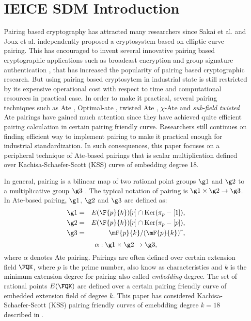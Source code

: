 \section{IEICE SDM Introduction}

Pairing based cryptography has attracted many researchers since Sakai et al. \cite{EPRINT:SakKas03} and Joux et al. \cite{JC:Joux04} independently proposed a cryptosystem based on elliptic curve pairing. This has encouraged to invent several innovative pairing based cryptographic applications such as broadcast encryption \cite{C:BonGenWat05} and group signature authentication \cite{C:BonBoySha04}, that has increased the popularity of pairing based cryptographic research.
But using pairing based cryptosytem in industrial state is still restricted by its expensive operational cost with respect to time and computational resources in practical case. 
In order to make it practical, several pairing techniques such as Ate \cite{DBLP:reference/crc/2005ehcc}, Optimal-ate \cite{DBLP:journals/tit/Vercauteren10}, twisted Ate \cite{EPRINT:MKHO07}, $\chi$-Ate \cite{PAIRING:NASKM08} and \textit{sub-field twisted} Ate \cite{PAIRING:DevScoDah07} pairings have gained much attention since they have achieved quite efficient pairing calculation in certain pairing friendly curve. 
Researchers still continues on finding efficient way to implement pairing to make it practical enough for industrial standardization. 
In such consequences, this paper focuses on a peripheral technique of Ate-based pairings  that is scalar multiplication defined over Kachisa-Schaefer-Scott (KSS) curve \cite{EPRINT:KacSchSco07} of embedding degree 18. 

In general, pairing is a bilinear map of two rational point groups $\g1$ and $\g2$ to a multiplicative group $\g3$ \cite{Silverman}.
The typical notation of pairing is $\g1 \times \g2 \rightarrow \g3$.
In  Ate-based pairing, $\g1$, $\g2$ and $\g3$ are defined as:
\begin{eqnarray}\label{eq:g_1}
\g1 & = &  E(\F{p}{k}) [r] \cap \text{Ker}(\pi_p - [1]), \nonumber \\
\g2 & = &  E(\F{p}{k}) [r] \cap \text{Ker}(\pi_p - [p]), \nonumber \\
\g3 & = & \mF{p}{k}/(\mF{p}{k})^r, \nonumber
\end{eqnarray}
\begin{equation}
\alpha : \g1 \times \g2 \rightarrow \g3,  \nonumber
\end{equation}
where $\alpha$ denotes Ate pairing.
Pairings are often defined over certain extension field $\FQK$, where $p$ is the prime number, also know as characteristics  and $k$  is the minimum extension degree for pairing also called \textit{embedding} degree. 
The set of rational points $E(\FQK)$ are defined over a certain pairing friendly curve of embedded extension field of degree $k$.
This paper has considered Kachisa-Schaefer-Scott (KSS) \cite{EPRINT:KacSchSco07} pairing friendly curves of emebdding degree $k=18$ described in \cite{EPRINT:FreScoTes06}.

